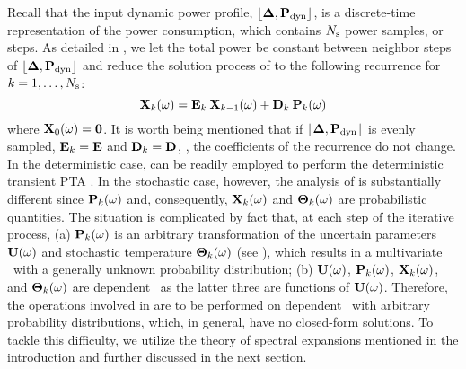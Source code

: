 Recall that the input dynamic power profile, $\profPdyn$, is a discrete-time representation of the power consumption, which contains $N_\text{s}$ power samples, or steps. As detailed in , we let the total power be constant between neighbor steps of $\profPdyn$ and reduce the solution process of  to the following recurrence for $k = 1, \dots, N_\text{s}$:
\begin{equation} \elabel{recurrence}
  \vX_k(\o) = \mE_k \: \vX_{k - 1}(\o) + \mD_k \: \vP_k(\o)
\end{equation}
where $\mathbf{X}_0(\omega) = \mathbf{0}$. It is worth being mentioned that if $\profPdyn$ is evenly sampled, $\mE_k = \mE$ and $\mD_k = \mD$, \ie, the coefficients of the recurrence do not change. In the deterministic case,  can be readily employed to perform the deterministic transient PTA \cite{thiele2011, ukhov2012}. In the stochastic case, however, the analysis of  is substantially different since $\mathbf{P}_k(\omega)$ and, consequently, $\mathbf{X}_k(\omega)$ and ${\boldsymbol\Theta}_k(\omega)$ are probabilistic quantities. The situation is complicated by fact that, at each step of the iterative process, (a) $\mathbf{P}_k(\omega)$ is an arbitrary transformation of the uncertain parameters $\mathbf{U}(\omega)$ and stochastic temperature ${\boldsymbol\Theta}_k(\omega)$ (see ), which results in a multivariate \rv\ with a generally unknown probability distribution; (b) $\mathbf{U}(\omega)$, $\mathbf{P}_k(\omega)$, $\mathbf{X}_k(\omega)$, and ${\boldsymbol\Theta}_k(\omega)$ are dependent \rvs\ as the latter three are functions of $\mathbf{U}(\omega)$. Therefore, the operations involved in  are to be performed on dependent \rvs\ with arbitrary probability distributions, which, in general, have no closed-form solutions. To tackle this difficulty, we utilize the theory of spectral expansions mentioned in the introduction and further discussed in the next section.
